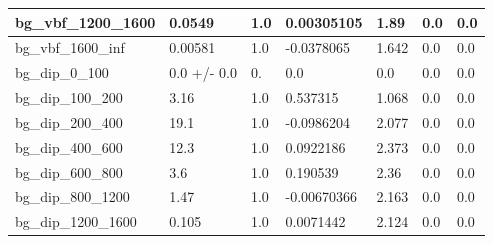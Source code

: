 \documentclass[a4paper, 10pt]{article}
\begin{document}
\begin{table}[H]
\begin{center}
\begin{tabular}{|m{23.0mm}|m{23.0mm}|m{18.0mm}|m{19.0mm}|m{19.0mm}|m{19.0mm}|m{19.0mm}|}
      \hline
      {\cellcolor{white}         bg\_vbf\_1200\_1600}& {\cellcolor{white}         0.0549}& {\cellcolor{white}         1.0}& {\cellcolor{white}         0.00305105}& {\cellcolor{white}         1.89}& {\cellcolor{green}         0.0}& {\cellcolor{green}         0.0}\\
      \hline
      {\cellcolor{white}         bg\_vbf\_1600\_inf}& {\cellcolor{white}         0.00581}& {\cellcolor{white}         1.0}& {\cellcolor{white}         -0.0378065}& {\cellcolor{white}         1.642}& {\cellcolor{green}         0.0}& {\cellcolor{green}         0.0}\\
      \hline
      {\cellcolor{white}         bg\_dip\_0\_100}& {\cellcolor{white}         0.0 +/\-- 0.0}& {\cellcolor{white}         0.}& {\cellcolor{white}         0.0}& {\cellcolor{white}         0.0}& {\cellcolor{green}         0.0}& {\cellcolor{green}         0.0}\\
      \hline
      {\cellcolor{white}         bg\_dip\_100\_200}& {\cellcolor{white}         3.16}& {\cellcolor{white}         1.0}& {\cellcolor{white}         0.537315}& {\cellcolor{white}         1.068}& {\cellcolor{green}         0.0}& {\cellcolor{green}         0.0}\\
      \hline
      {\cellcolor{white}         bg\_dip\_200\_400}& {\cellcolor{white}         19.1}& {\cellcolor{white}         1.0}& {\cellcolor{white}         -0.0986204}& {\cellcolor{white}         2.077}& {\cellcolor{green}         0.0}& {\cellcolor{green}         0.0}\\
      \hline
      {\cellcolor{white}         bg\_dip\_400\_600}& {\cellcolor{white}         12.3}& {\cellcolor{white}         1.0}& {\cellcolor{white}         0.0922186}& {\cellcolor{white}         2.373}& {\cellcolor{green}         0.0}& {\cellcolor{green}         0.0}\\
      \hline
      {\cellcolor{white}         bg\_dip\_600\_800}& {\cellcolor{white}         3.6}& {\cellcolor{white}         1.0}& {\cellcolor{white}         0.190539}& {\cellcolor{white}         2.36}& {\cellcolor{green}         0.0}& {\cellcolor{green}         0.0}\\
      \hline
      {\cellcolor{white}         bg\_dip\_800\_1200}& {\cellcolor{white}         1.47}& {\cellcolor{white}         1.0}& {\cellcolor{white}         -0.00670366}& {\cellcolor{white}         2.163}& {\cellcolor{green}         0.0}& {\cellcolor{green}         0.0}\\
      \hline
      {\cellcolor{white}         bg\_dip\_1200\_1600}& {\cellcolor{white}         0.105}& {\cellcolor{white}         1.0}& {\cellcolor{white}         0.0071442}& {\cellcolor{white}         2.124}& {\cellcolor{green}         0.0}& {\cellcolor{green}         0.0}\\

\end{tabular}
\end{center}
\end{table}
\end{document}
